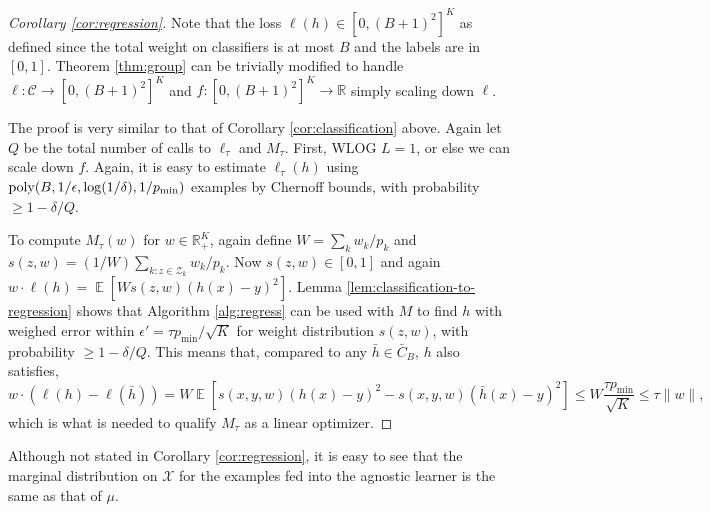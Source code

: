 \documentclass[final, 12pt]{colt2018} %
\def\reals{{\mathbb R}}
\newcommand{\eps}{\epsilon}
\newcommand{\E}{\mathop{\mathbb{E}}}
\newcommand{\pmin}{p_{\text{min}}}
\def\calC{\mathcal{C}}
\def\calX{\mathcal{X}}
\def\calZ{\mathcal{Z}}
\newcommand{\poly}{\mathop{\mbox{\text{poly}}}}
\begin{document}
\begin{proof}[Corollary \ref{cor:regression}]
Note that the loss $\ell(h)\in [0,(B+1)^2]^K$ as defined since the total weight on classifiers is at most $B$ and the labels are in $[0,1]$. Theorem \ref{thm:group} can be trivially modified to handle $\ell:\calC \rightarrow [0,(B+1)^2]^K$ and $f: [0,(B+1)^2]^K\rightarrow \reals$ simply scaling down $\ell$. 

The proof is very similar to that of Corollary \ref{cor:classification} above. Again let $Q$ be the total number of calls to $\ell_\tau$ and $M_\tau$. First, WLOG $L=1$, or else we can scale down $f$. Again, it is easy to estimate $\ell_\tau(h)$ using $\poly(B,1/\eps,\log(1/\delta), 1/\pmin)$ examples by Chernoff bounds, with probability $\geq 1-\delta/Q$. 

To compute $M_\tau(w)$ for $w \in \reals_+^K$, again define $W = \sum_k w_k/p_k$ and $s(z,w)=(1/W)\sum_{k: z \in \calZ_k} w_k/p_k$. Now $s(z,w)\in [0,1]$ and again $w \cdot \ell(h) = \E[W s(z,w) (h(x)-y)^2]$. Lemma \ref{lem:classification-to-regression} shows that Algorithm \ref{alg:regress} can be used with $M$ to find $h$ with weighed error within $\eps'=\tau \pmin/\sqrt{K}$ for weight distribution $s(z,w)$, with probability $\geq 1-\delta/Q$. This means that, compared to any $\bar{h}\in \bar{C}_B$, $h$ also satisfies,
$$w \cdot (\ell(h)-\ell(\bar{h})) =
W \E[s(x,y,w) (h(x)-y)^2 - s(x,y,w) (\bar{h}(x)-y)^2] \leq W\frac{\tau\pmin}{\sqrt{K}}\leq \tau \|w\|,$$
which is what is needed to qualify $M_\tau$ as a linear optimizer.
\end{proof}
Although not stated in Corollary \ref{cor:regression}, it is easy to see that the marginal distribution on $\calX$ for the examples fed into the agnostic learner is the same as that of $\mu$.
\end{document}
